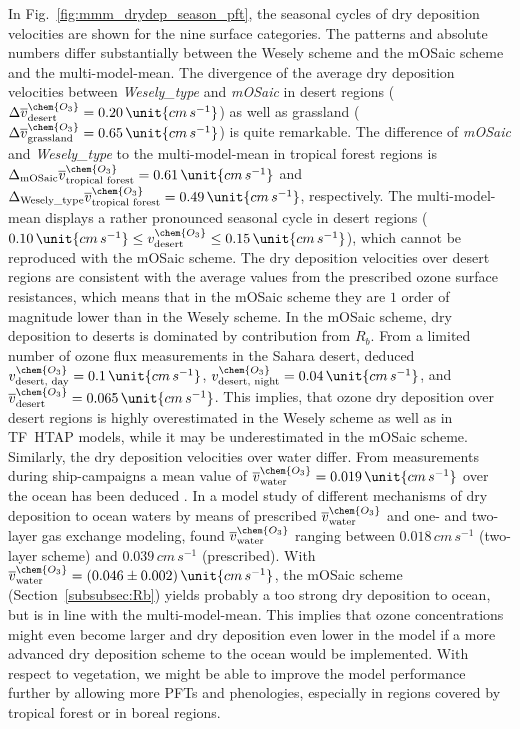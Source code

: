 \documentclass[gmd, manuscript]{copernicus}
\begin{document}
In Fig.~\ref{fig:mmm_drydep_season_pft}, the seasonal cycles of dry deposition velocities are shown for the nine surface categories. The patterns and absolute numbers differ substantially between the Wesely scheme and the mOSaic scheme and the multi-model-mean. The divergence of the average dry deposition velocities between \emph{Wesely\_type} and \emph{mOSaic} in desert regions ($\Delta \overline{v}_\text{desert}^\chem{O_3} = 0.20\,\unit{cm\,s^{-1}}$) as well as grassland ($\Delta \overline{v}_\text{grassland}^\chem{O_3} = 0.65\,\unit{cm\,s^{-1}}$) is quite remarkable. The difference of \emph{mOSaic} and \emph{Wesely\_type} to the multi-model-mean in tropical forest regions is $\Delta_\text{mOSaic} \overline{v}_\text{tropical forest}^\chem{O_3} = 0.61\,\unit{cm\,s^{-1}}$ and $\Delta_\text{Wesely\_type} \overline{v}_\text{tropical forest}^\chem{O_3} = 0.49\,\unit{cm\,s^{-1}}$, respectively. The multi-model-mean displays a rather pronounced seasonal cycle in desert regions ($0.10\,\unit{cm\,s^{-1}} \leq v^\chem{O_3}_\text{desert}\leq 0.15\,\unit{cm\,s^{-1}}$), which cannot be reproduced with the mOSaic scheme. The dry deposition velocities over desert regions are consistent with the average values from the prescribed ozone surface resistances, which means that in the mOSaic scheme they are $1$ order of magnitude lower than in the Wesely scheme. In the mOSaic scheme, dry deposition to deserts is dominated by contribution from $R_b$. From a limited number of ozone flux measurements in the Sahara desert, \citet{AE:Gusten1995} deduced $v^\chem{O_3}_\text{desert, day} = 0.1\,\unit{cm\,s^{-1}}$, $v^\chem{O_3}_\text{desert, night} = 0.04\,\unit{cm\,s^{-1}}$, and $\overline{v}^\chem{O_3}_\text{desert} = 0.065\,\unit{cm\,s^{-1}}$. This implies, that ozone dry deposition over desert regions is highly overestimated in the Wesely scheme as well as in TF~HTAP models, while it may be underestimated in the mOSaic scheme. Similarly, the dry deposition velocities over water differ. From measurements during ship-campaigns a mean value of $\overline{v}^\chem{O_3}_\text{water} = 0.019\,\unit{cm\,s^{-1}}$ over the ocean has been deduced \citep{JGR:Helmig2012}. In a model study of different mechanisms of dry deposition to ocean waters by means of prescribed $\overline{v}_\text{water}^\chem{O_3}$ and one- and two-layer gas exchange modeling, \citet{ACP:Luhar2017} found $\overline{v}_\text{water}^\chem{O_3}$ ranging between $0.018\,\unit{cm\,s^{-1}}$ (two-layer scheme) and $0.039\,\unit{cm\,s^{-1}}$ (prescribed). With $\overline{v}^\chem{O_3}_\text{water} = (0.046\pm0.002)\,\unit{cm\,s^{-1}}$, the mOSaic scheme (Section~\ref{subsubsec:Rb}) yields probably a too strong dry deposition to ocean, but is in line with the multi-model-mean. This implies that ozone concentrations might even become larger and dry deposition even lower in the model if a more advanced dry deposition scheme to the ocean would be implemented. With respect to vegetation, we might be able to improve the model performance further by allowing more PFTs and phenologies, especially in regions covered by tropical forest \citep{GCB:Anav2017} or in boreal regions. 
\end{document}
